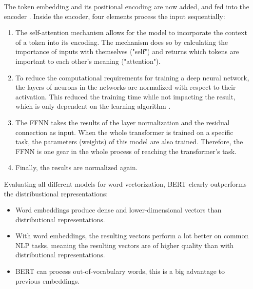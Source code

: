                
               The token embedding and its positional encoding are now added, and fed into the encoder \cite{illustratedTransformer}. Inside the encoder, four elements process the input sequentially:
               
               \begin{enumerate}
               	\item The self-attention mechanism allows for the model to incorporate the context of a token into its encoding. The mechanism does so by calculating the importance of inputs with themselves ("self") and returns which tokens are important to each other's meaning ("attention").
               	\item To reduce the computational requirements for training a deep neural network, the layers of neurons in the networks are normalized with respect to their activation. This reduced the training time while not impacting the result, which is only dependent on the learning algorithm \cite[p.~10]{baLayerNormalization2016}.
               	\item The \ac{FFNN} takes the results of the layer normalization and the residual connection as input. When the whole transformer is trained on a specific task, the parameters (weights) of this model are also trained. Therefore, the \ac{FFNN} is one gear in the whole process of reaching the transformer's task.
               	\item Finally, the results are normalized again.
               \end{enumerate}
       			
%       				
			
            
            Evaluating all different models for word vectorization, BERT clearly outperforms the distribustional representations:
            \begin{itemize}
            	\item Word embeddings produce dense and lower-dimensional vectors than distributional representations.
            	\item With word embeddings, the resulting vectors perform a lot better on common \ac{NLP} tasks, meaning the resulting vectors are of higher quality than with distributional representations.
            	\item BERT can process out-of-vocabulary words, this is a big advantage to previous embeddings.
            \end{itemize}

